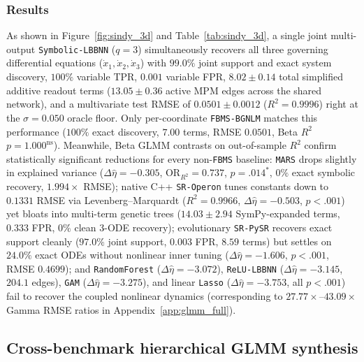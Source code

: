 \documentclass[11pt,a4paper]{article}
\begin{document}
\subsubsection{Results}
As shown in Figure~\ref{fig:sindy_3d} and Table~\ref{tab:sindy_3d}, a single joint multi-output \texttt{Symbolic-LBBNN} ($q = 3$) simultaneously recovers all three governing differential equations ($\dot{x}_1, \dot{x}_2, \dot{x}_3$) with $99.0\%$ joint support and exact system discovery, $100\%$ variable TPR, $0.001$ variable FPR, $8.02 \pm 0.14$ total simplified additive readout terms ($13.05 \pm 0.36$ active MPM edges across the shared network), and a multivariate test RMSE of $0.0501 \pm 0.0012$ ($R^2 = 0.9996$) right at the $\sigma = 0.050$ oracle floor. Only per-coordinate \texttt{FBMS-BGNLM} matches this performance ($100\%$ exact discovery, $7.00$ terms, RMSE $0.0501$, Beta $R^2$ $p = 1.000^{\text{ns}}$). Meanwhile, Beta GLMM contrasts on out-of-sample $R^2$ confirm statistically significant reductions for every non-\texttt{FBMS} baseline: \texttt{MARS} drops slightly in explained variance ($\Delta\hat{\eta} = -0.305$, $\mathrm{OR}_{R^2} = 0.737$, $p = .014^{*}$, $0\%$ exact symbolic recovery, $1.994\times$ RMSE); native C++ \texttt{SR-Operon} tunes constants down to $0.1331$ RMSE via Levenberg--Marquardt ($R^2 = 0.9966$, $\Delta\hat{\eta} = -0.503$, $p < .001$) yet bloats into multi-term genetic trees ($14.03 \pm 2.94$ SymPy-expanded terms, $0.333$ FPR, $0\%$ clean 3-ODE recovery); evolutionary \texttt{SR-PySR} recovers exact support cleanly ($97.0\%$ joint support, $0.003$ FPR, $8.59$ terms) but settles on $24.0\%$ exact ODEs without nonlinear inner tuning ($\Delta\hat{\eta} = -1.606$, $p < .001$, RMSE $0.4699$); and \texttt{RandomForest} ($\Delta\hat{\eta} = -3.072$), \texttt{ReLU-LBBNN} ($\Delta\hat{\eta} = -3.145$, $204.1$ edges), \texttt{GAM} ($\Delta\hat{\eta} = -3.275$), and linear \texttt{Lasso} ($\Delta\hat{\eta} = -3.753$, all $p < .001$) fail to recover the coupled nonlinear dynamics (corresponding to $27.77\times\text{--}43.09\times$ Gamma RMSE ratios in Appendix~\ref{app:glmm_full}).

\subsection{Cross-benchmark hierarchical GLMM synthesis}
\label{sec:exp:joint_glmm}
\end{document}
